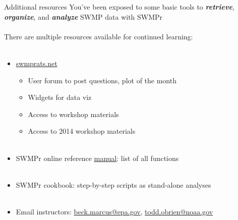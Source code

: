 \documentclass[xcolor=dvipsnames,serif]{beamer}\usepackage[]{graphicx}\usepackage[]{color}
\newcommand{\Bigtxt}[1]{\textbf{\textit{#1}}}
\begin{document}
\begin{frame}{Additional resources}
You've been exposed to some basic tools to \Bigtxt{retrieve}, \Bigtxt{organize}, and \Bigtxt{analyze} SWMP data with SWMPr \\~\\
There are multiple resources available for continued learning: \\~\\
\begin{itemize}
\item \href{http://swmprats.net/}{swmprats.net}
\begin{itemize}
\item User forum to post questions, plot of the month
\item Widgets for data viz
\item Access to workshop materials
\item Access to 2014 workshop materials \\~\\
\end{itemize}
\item SWMPr online reference \href{https://cran.r-project.org/web/packages/SWMPr/SWMPr.pdf}{manual}: list of all functions \\~\\
\item SWMPr cookbook: step-by-step scripts as stand-alone analyses \\~\\
\item Email instructors: \href{mailto:beck.marcus@epa.gov}{beck.marcus@epa.gov}, \href{todd.obrien@noaa.gov}{todd.obrien@noaa.gov}
\end{itemize}
\end{frame}

\end{document}
